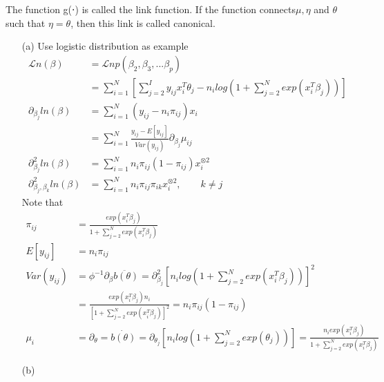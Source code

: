 \documentclass{article}
\begin{document}
The function g(⋅) is called the link function. If the function connects$\mu ,\eta$ and $\theta$ such that $\eta = \theta$, then this link is called canonical.\\

\begin{itemize}
    \item [(a)] Use logistic distribution as example
\begin{align*}
    \mathcal{L}n (\beta) &= \mathcal{L}n p(\beta_2, \beta_3,... \beta_p) \\
    &= \sum_{i=1}^N \left[ \sum_{j=2}^I  y_{ij} x_i^T \theta_j - n_i log \left( 1+ \sum_{j=2}^N exp(x_i^T \beta_j) \right) \right] \\
    \partial_{\beta_j} \mathit{l}n (\beta) &=  \sum_{i=1}^N (y_{ij} - n_{i} \pi_{ij}) x_i \\
    &=  \sum_{i=1}^N \frac{y_{ij} - E[y_{ij}]}{Var(y_{ij})} \partial_{\beta_j} \mu_{ij}\\
    \partial^2_{\beta_j} \mathit{l}n (\beta) &=  \sum_{i=1}^N n_{i} \pi_{ij} (1- \pi_{ij}) x_i^{\otimes 2} \\
    \partial^2_{\beta_j, \beta_k} \mathit{l}n (\beta) &=  \sum_{i=1}^N n_{i}  \pi_{ij} \pi_{ik} x_i^{\otimes 2}, \qquad k \neq j
\end{align*}
Note that
\begin{align*}
    \pi_{ij} &= \frac{exp(x_i^T\beta_j)}{1+ \sum_{j=2}^N exp(x_i^T \beta_j)} \\
    E[y_{ij}] &= n_i \pi_{ij}\\
    Var(y_{ij})&= \phi^{-1} \partial_{\beta} \ddot{b(\theta)}= \partial^2_{\beta_j} \left[ n_i log \left( 1+ \sum_{j=2}^N exp(x_i^T \beta_j) \right) \right ] ^2\\
    &=\frac{exp(x_i^T\beta_j)n_i}{\left[ 1+ \sum_{j=2}^N exp(x_i^T \beta_j)\right ]^2} = n_i \pi_{ij} (1-\pi_{ij})\\
    \mu_i &= \partial_{\theta} = \dot{b(\theta)} = \partial_{\theta_j} \left[ n_i log \left( 1+ \sum_{j=2}^N exp(\theta_j) \right) \right ] =  \frac{n_i exp(x_i^T\beta_j)}{1+ \sum_{j=2}^N exp(x_i^T \beta_j)}
\end{align*}
    \item[(b)] 
      
\end{itemize}
\end{document}

